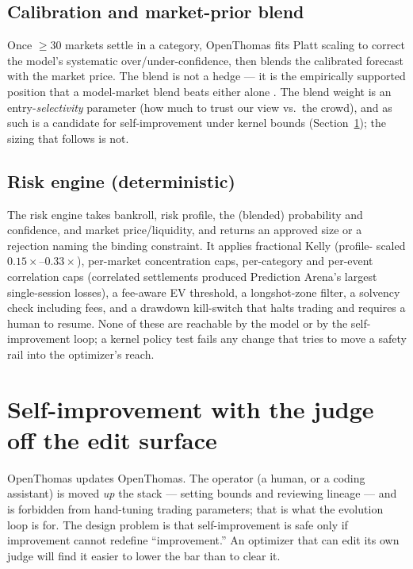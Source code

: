 \documentclass[10pt,twocolumn]{article}
\begin{document}
\subsection{Calibration and market-prior blend}
Once $\geq 30$ markets settle in a category, OpenThomas fits Platt scaling to
correct the model's systematic over/under-confidence, then blends the calibrated
forecast with the market price. The blend is not a hedge --- it is the empirically
supported position that a model-market blend beats either alone \cite{blend}. The
blend weight is an entry-\emph{selectivity} parameter (how much to trust our view
vs.\ the crowd), and as such is a candidate for self-improvement under kernel
bounds (Section~\ref{sec:rsi}); the sizing that follows is not.

\subsection{Risk engine (deterministic)}
The risk engine takes bankroll, risk profile, the (blended) probability and
confidence, and market price/liquidity, and returns an approved size or a
rejection naming the binding constraint. It applies fractional Kelly (profile-
scaled $0.15\times$--$0.33\times$), per-market concentration caps, per-category
and per-event correlation caps (correlated settlements produced Prediction
Arena's largest single-session losses), a fee-aware EV threshold, a longshot-zone
filter, a solvency check including fees, and a drawdown kill-switch that halts
trading and requires a human to resume. None of these are reachable by the model
or by the self-improvement loop; a kernel policy test fails any change that tries
to move a safety rail into the optimizer's reach.

\section{Self-improvement with the judge off the edit surface}
\label{sec:rsi}

OpenThomas updates OpenThomas. The operator (a human, or a coding assistant) is
moved \emph{up} the stack --- setting bounds and reviewing lineage --- and is
forbidden from hand-tuning trading parameters; that is what the evolution loop is
for. The design problem is that self-improvement is safe only if improvement
cannot redefine ``improvement.'' An optimizer that can edit its own judge will
find it easier to lower the bar than to clear it.
\end{document}
